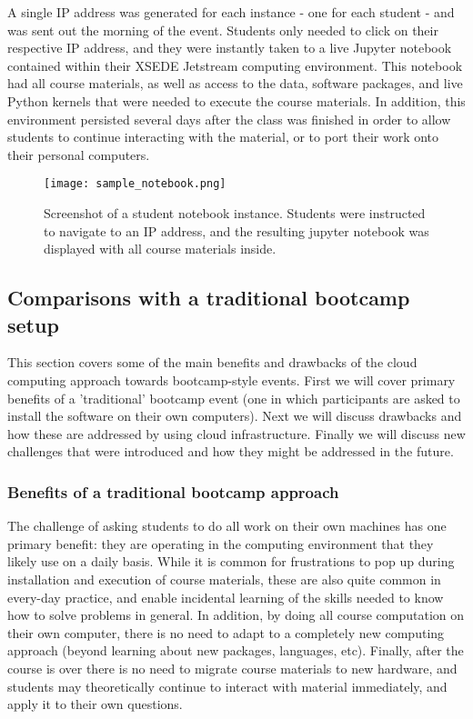 \begin{enumerate}
A single IP address was generated for each instance - one
for each student - and was sent out the morning of the event. Students only
needed to click on their respective IP address, and they were instantly taken to
a live Jupyter notebook contained within their XSEDE Jetstream computing
environment. This notebook had all course materials, as well as access to the
data, software packages, and live Python kernels that were needed to execute the
course materials. In addition, this environment persisted several days after the
class was finished in order to allow students to continue interacting with the
material, or to port their work onto their personal computers.

\end{enumerate}

\begin{figure}[h]
\centering
\texttt{[image: sample\_notebook.png]}
\caption{Screenshot of a student notebook instance. Students were instructed to
         navigate to an IP address, and the resulting jupyter notebook was
         displayed with all course materials inside.}
\end{figure}

\subsection{Comparisons with a traditional bootcamp setup}

This section covers some of the main benefits and drawbacks of the cloud
computing approach towards bootcamp-style events. First we will cover primary
benefits of a 'traditional' bootcamp event (one in which participants are asked
to install the software on their own computers). Next we will discuss drawbacks
and how these are addressed by using cloud infrastructure. Finally we will
discuss new challenges that were introduced and how they might be addressed in
the future.

\subsubsection{Benefits of a traditional bootcamp approach}

The challenge of asking students to do all work on their own machines has one
primary benefit: they are operating in the computing environment that they
likely use on a daily basis. While it is common for frustrations to pop up
during installation and execution of course materials, these are also
quite common in every-day practice, and enable incidental learning
of the skills needed to know how to solve problems in general.
In addition, by doing all course computation on
their own computer, there is no need to adapt to a completely new computing
approach (beyond learning about new packages, languages, etc). Finally, after
the course is over there is no need to migrate course materials to new hardware,
and students may theoretically continue to interact with material immediately,
and apply it to their own questions.

